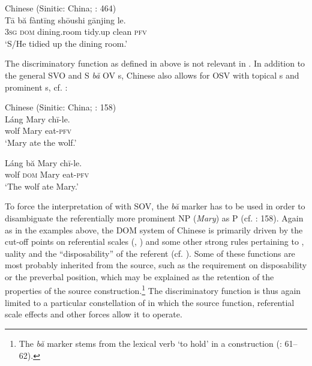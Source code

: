 \documentclass[output=paper]{langsci/langscibook}
\begin{document}
\ea \label{ex:serzant:20}
Chinese (Sinitic: China; \citealt{LiThompson1981}: 464)\\
\gll Tā   bă   fàntīng   shōushi   gānjing le.\\
     \textsc{3sg}  \textsc{dom}  dining.room   tidy.up   clean   \textsc{pfv}\\
\glt ‘S/He tidied up the dining room.’
\z

The discriminatory function as defined in  above is not relevant in . In addition to the general SVO and S \textit{bă} OV s, Chinese also allows for OSV with topical s and prominent s, cf. :

\ea\label{ex:serzant:21}
Chinese (Sinitic: China; \citealt{Bisang1992}: 158)\\
\ea
\gll Láng   Mary   chī-le.\\
     wolf  Mary  eat-\textsc{pfv}\\
\glt ‘Mary ate the wolf.’

\ex
\gll Láng bă   Mary   chī-le.\\
     wolf \textsc{dom}   Mary  eat-\textsc{pfv}\\
\glt ‘The wolf ate Mary.’
\z
\z

To force the interpretation of  with SOV, the \textit{bă} marker has to be used in order to disambiguate the referentially more prominent NP (\textit{Mary}) as P (cf. \citealt{Bisang1992}: 158). Again as in the examples above, the DOM system of Chinese is primarily driven by the cut-off points on referential scales (, ) and some other strong rules pertaining to , uality and the “disposability” of the  referent (cf. \citealt{LiThompson1981}). Some of these functions are most probably inherited from the source, such as the requirement on disposability or the preverbal position, which may be explained as the retention of the properties of the source construction.\footnote{The \textit{bă} marker stems from the lexical verb ‘to hold’ in a  construction (\citealt{Sun1996}: 61–62).}  The discriminatory function is thus again limited to a particular constellation of  in which the source function, referential scale effects and other forces allow it to operate.
\end{document}
